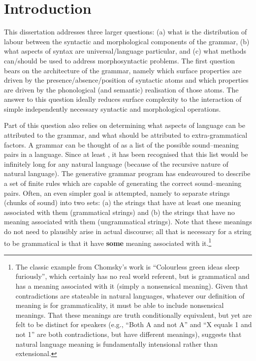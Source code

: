 \chapter{Introduction}
\label{ch:introduction}

This dissertation addresses three larger questions: (a) what is the distribution of labour between the syntactic and morphological components of the grammar, (b) what aspects of syntax are universal/language particular, and (c) what methods can/should be used to address morphosyntactic problems. The first question bears on the architecture of the grammar, namely which surface properties are driven by the presence/absence/position of syntactic atoms and which properties are driven by the phonological (and semantic) realisation of those atoms. The answer to this question ideally reduces surface complexity to the interaction of simple independently necessary syntactic and morphological operations.

Part of this question also relies on determining what aspects of language can be attributed to the grammar, and what should be attributed to extra-grammatical factors. A grammar can be thought of as a list of the possible sound--meaning pairs in a language. Since at least \cite{Chomsky.1957}, it has been recognised that this list would be infinitely long for any natural language (because of the recursive nature of natural language). The generative grammar program has endeavoured to describe a set of finite rules which are capable of generating the correct sound--meaning pairs. Often, an even simpler goal is attempted, namely to separate strings (chunks of sound) into two sets: (a) the strings that have at least one meaning associated with them (grammatical strings) and (b) the strings that have no meaning associated with them (ungrammatical strings). Note that these meanings do not need to plausibly arise in actual discourse; all that is necessary for a string to be grammatical is that it have \textbf{some} meaning associated with it.\footnote{The classic example from Chomsky's work is ``Colourless green ideas sleep furiously'', which certainly has no real world referent, but is grammatical and has a meaning associated with it (simply a nonsensical meaning). Given that contradictions are stateable in natural languages, whatever our definition of meaning is for grammaticality, it must be able to include nonsensical meanings. That these meanings are truth conditionally equivalent, but yet are felt to be distinct for speakers (e.g., ``Both A and not A'' and ``X equals 1 and not 1'' are both contradictions, but have different meanings), suggests that natural language meaning is fundamentally intensional rather than extensional.}

